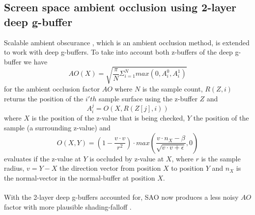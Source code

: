\documentclass{ACGSeminar}
\begin{document}
	\subsection{Screen space ambient occlusion using 2-layer deep g-buffer}
		Scalable ambient obscurance \cite{SAO}, which is an ambient occlusion method, is extended to work with deep g-buffers. To take into account both z-buffers of the deep g-buffer we have
		$$ AO(X) = \sqrt{\frac{\pi}{N} \Sigma_{i=1}^{N} max(0, A_{i}^{0}, A_{i}^{1})} $$
		for the ambient occlusion factor $AO$ where $N$ is the sample count, $R(Z, i)$ returns the position of the $i'th$ sample surface using the z-buffer $Z$ and
		$$ A_{i}^{j} = O(X, R(Z[j], i))$$
		where $X$ is the position of the z-value that is being checked, $Y$ the position of the sample (a surrounding z-value) and
		$$ O(X, Y) = (1 - \frac{v \cdot v}{r^2}) \cdot max(\frac{v \cdot n_X - \beta}{\sqrt{v \cdot v + \epsilon}}, 0) $$
		evaluates if the z-value at $Y$ is occluded by z-value at $X$, where $r$ is the sample radius, $v = Y - X$ the direction vector from position $X$ to position $Y$ and $n_X$ is the normal-vector in the normal-buffer at position $X$. \\\\
		With the 2-layer deep g-buffers accounted for, SAO now produces a less noisy $AO$ factor with more plausible shading-falloff \cite{Mara2016DeepGBuffer}. 
		
\end{document}
